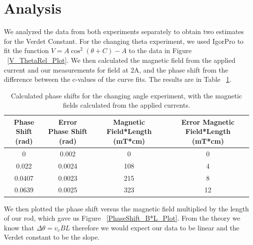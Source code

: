 \documentclass[prb,preprint]{revtex4-1}
\begin{document}
\section{Analysis}

We analyzed the data from both experiments separately to obtain two estimates for the Verdet Constant.  For the changing theta experiment, we used IgorPro to fit the function $V = A \cos ^2 (\theta + C) - A$ to the data in Figure ~\ref{V_ThetaRel_Plot}.  We then calculated the magnetic field from the applied current and our measurements for field at 2A, and the phase shift from the difference between the c-values of the curve fits.  The results are in Table ~\ref{B*L_PhaseShift_Table}.  

\begin{table}[h!]
\centering
\caption{Calculated phase shifts for the changing angle experiment, with the magnetic fields calculated from the applied currents.}
\begin{ruledtabular}
\begin{tabular}{c c c c}
Phase Shift (rad) & Error Phase Shift (rad) & Magnetic Field*Length (mT*cm) & Error Magnetic Field*Length (mT*cm)\\
\hline	%
0 & 0.002  & 0  & 0  \\
0.022  & 0.0024 & 108 & 4  \\
0.0407 & 0.0023 & 215 & 8  \\
0.0639 & 0.0025 & 323 & 12
\end{tabular}
\end{ruledtabular}
\label{B*L_PhaseShift_Table}
\end{table}

We then plotted the phase shift versus the magnetic field multiplied by the length of our rod, which gave us Figure ~\ref{PhaseShift_B*L_Plot}. From the theory we know that $\Delta \theta = v_c B L$ therefore we would expect our data to be linear and the Verdet constant to be the slope.
\end{document}
